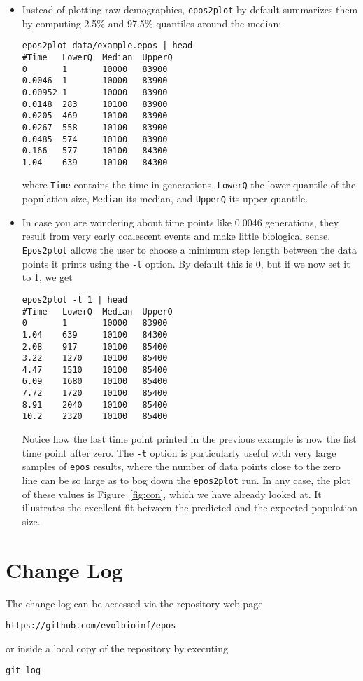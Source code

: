 \documentclass[a4paper, english]{article}
\newcommand{\ty}{\texttt}
\begin{document}
\begin{itemize}
\item  Instead of plotting raw demographies, \ty{epos2plot} by default
  summarizes them by computing 2.5\% and 97.5\% quantiles around the
  median:
\begin{verbatim}
epos2plot data/example.epos | head
#Time   LowerQ  Median  UpperQ
0       1       10000   83900
0.0046  1       10000   83900
0.00952 1       10000   83900
0.0148  283     10100   83900
0.0205  469     10100   83900
0.0267  558     10100   83900
0.0485  574     10100   83900
0.166   577     10100   84300
1.04    639     10100   84300
\end{verbatim}
where \ty{Time} contains the time in generations, \ty{LowerQ} the
lower quantile of the population size, \ty{Median} its median, and
\ty{UpperQ} its upper quantile.

\item In case you are wondering about time points like 0.0046
  generations, they result from very early coalescent events and make
  little biological sense. \ty{Epos2plot} allows the user to choose a
  minimum step length between the data points it prints using the
  \ty{-t} option. By default this is 0, but if we now set it to 1, we
  get
\begin{verbatim}
epos2plot -t 1 | head
#Time   LowerQ  Median  UpperQ
0       1       10000   83900
1.04    639     10100   84300
2.08    917     10100   85400
3.22    1270    10100   85400
4.47    1510    10100   85400
6.09    1680    10100   85400
7.72    1720    10100   85400
8.91    2040    10100   85400
10.2    2320    10100   85400
\end{verbatim}
Notice how the last time point printed in the previous example is now
the fist time point after zero. The \ty{-t} option is particularly
useful with very large samples of \ty{epos} results, where the number
of data points close to the zero line can be so large as to bog down
the \ty{epos2plot} run.  In any case, the plot of these values is
Figure~\ref{fig:con}, which we have already looked at. It illustrates
the excellent fit between the predicted and the expected population
size.
\end{itemize}


\section{Change Log}
The change log can be accessed via the repository web page
\begin{verbatim}
https://github.com/evolbioinf/epos
\end{verbatim}
or inside a local copy of the repository by executing
\begin{verbatim}
git log
\end{verbatim}


\end{document}
